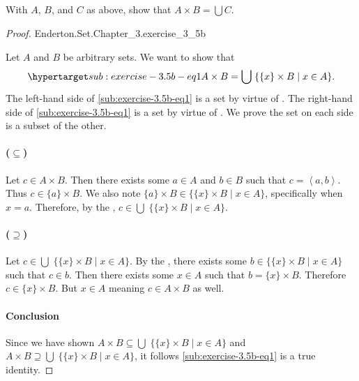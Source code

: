 \documentclass{report}
\newcommand{\pair}[1]{\left< #1 \right>}
\begin{document}
\subsection{}%

With $A$, $B$, and $C$ as above, show that $A \times B = \bigcup C$.

\begin{proof}

    {Enderton.Set.Chapter\_3.exercise\_3\_5b}

  Let $A$ and $B$ be arbitrary sets.
  We want to show that
    \begin{equation}
      \hyperlabel{sub:exercise-3.5b-eq1}
      A \times B = \bigcup\; \{\{x\} \times B \mid x \in A\}.
    \end{equation}
  The left-hand side of \eqref{sub:exercise-3.5b-eq1} is a set by virtue of
    .
  The right-hand side of \eqref{sub:exercise-3.5b-eq1} is a set by virtue of
    .
  We prove the set on each side is a subset of the other.

  \paragraph{($\subseteq$)}%

    Let $c \in A \times B$.
    Then there exists some $a \in A$ and $b \in B$ such that $c = \pair{a, b}$.
    Thus $c \in \{a\} \times B$.
    We also note $\{a\} \times B \in \{\{x\} \times B \mid x \in A\}$,
      specifically when $x = a$.
    Therefore, by the ,
      $c \in \bigcup\;\{\{x\} \times B \mid x \in A\}$.

  \paragraph{($\supseteq$)}%

    Let $c \in \bigcup\; \{\{x\} \times B \mid x \in A\}$.
    By the , there exists some
      $b \in \{\{x\} \times B \mid x \in A\}$ such that $c \in b$.
    Then there exists some $x \in A$ such that $b = \{x\} \times B$.
    Therefore $c \in \{x\} \times B$.
    But $x \in A$ meaning $c \in A \times B$ as well.

  \paragraph{Conclusion}%

    Since we have shown
      $A \times B \subseteq \bigcup\; \{\{x\} \times B \mid x \in A\}$ and
      $A \times B \supseteq \bigcup\; \{\{x\} \times B \mid x \in A\}$, it
      follows \eqref{sub:exercise-3.5b-eq1} is a true identity.

\end{proof}
\end{document}

